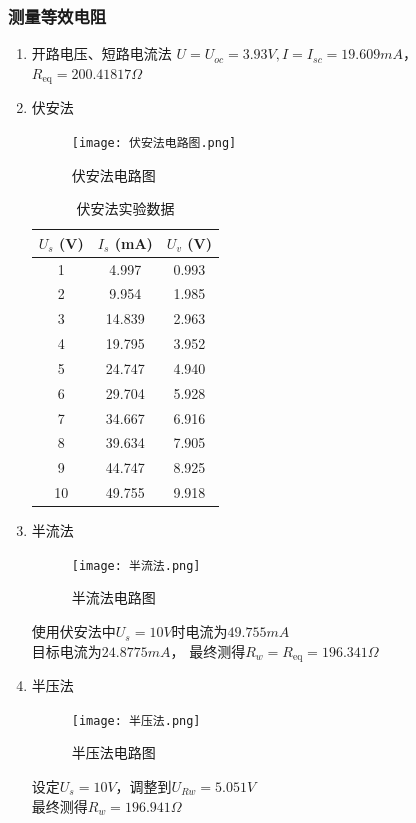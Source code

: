 \documentclass[dvipsnames, svgnames,a4paper,11pt]{article}
\begin{document}
	\subsubsection{测量等效电阻} 
	\begin{enumerate}

     \item 开路电压、短路电流法
	 $U=U_{oc}=3.93V,I=I_{sc}=19.609mA$，$R_{\mathrm{eq}}=200. 41817 \Omega $
	 \item 伏安法
	     \begin{figure}[{H}]
			\centering
			\texttt{[image: 伏安法电路图.png]}
			\caption{伏安法电路图}
			\label{}
		 \end{figure}
		 \begin{table}[h]
			\centering
			\begin{tabular}{|c|c|c|}
			\hline
			$U_s$ (V) & $I_s$ (mA) & $U_v$ (V) \\
			\hline
			1 & 4.997 & 0.993 \\
			2 & 9.954 & 1.985 \\
			3 & 14.839 & 2.963 \\
			4 & 19.795 & 3.952 \\
			5 & 24.747 & 4.940 \\
			6 & 29.704 & 5.928 \\
			7 & 34.667 & 6.916 \\
			8 & 39.634 & 7.905 \\
			9 & 44.747 & 8.925 \\
			10 & 49.755 & 9.918 \\
			\hline
			\end{tabular}
			\caption{伏安法实验数据}
			\label{tab:data}
			\end{table}
			\item 半流法
			\begin{figure}[{H}]
				\centering
				\texttt{[image: 半流法.png]}
				\caption{半流法电路图}
				\label{}
			\end{figure}
			使用伏安法中$U_s=10V$时电流为$49.755mA$\\目标电流为$24.8775mA$，
			最终测得$R_w=R_{\mathrm{eq}}=196.341 \Omega $
			\item 半压法
			\begin{figure}[{H}]
				\centering
				\texttt{[image: 半压法.png]}
				\caption{半压法电路图}
				\label{}
			\end{figure}
			设定$U_s=10V$，调整到$U_{Rw}=5.051V$\\
			最终测得$R_w=196.941\Omega$
			

		 
	\end{enumerate}
\end{document}
